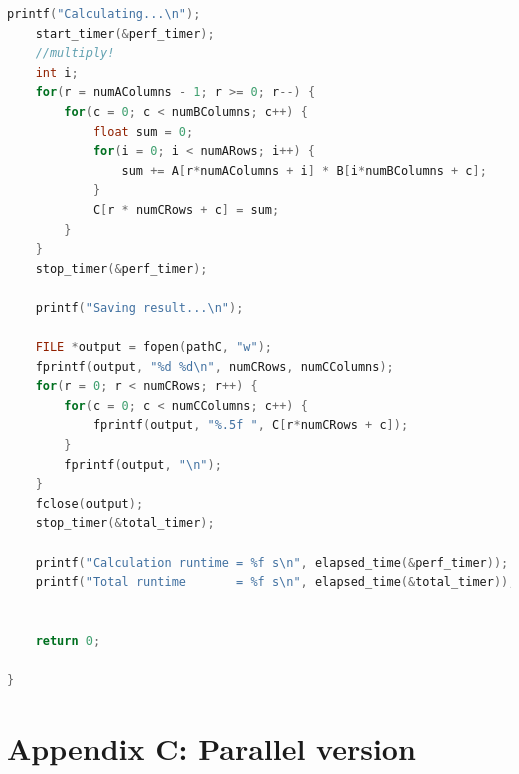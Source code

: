 \documentclass[11pt,a4paper]{article}
\begin{document}
\begin{lstlisting}[language=c]
	printf("Calculating...\n");
	start_timer(&perf_timer);
	//multiply!
	int i;
	for(r = numAColumns - 1; r >= 0; r--) {
		for(c = 0; c < numBColumns; c++) {
			float sum = 0;
			for(i = 0; i < numARows; i++) {
				sum += A[r*numAColumns + i] * B[i*numBColumns + c];
			}
			C[r * numCRows + c] = sum;
		}
	}
	stop_timer(&perf_timer);
	
	printf("Saving result...\n");
	
	FILE *output = fopen(pathC, "w");
	fprintf(output, "%d %d\n", numCRows, numCColumns);
	for(r = 0; r < numCRows; r++) {
		for(c = 0; c < numCColumns; c++) {
			fprintf(output, "%.5f ", C[r*numCRows + c]);
		}
		fprintf(output, "\n");
	}
	fclose(output);
	stop_timer(&total_timer);
	
	printf("Calculation runtime = %f s\n", elapsed_time(&perf_timer));
	printf("Total runtime       = %f s\n", elapsed_time(&total_timer));
	
	
	return 0;
	
}
	\end{lstlisting}
	
	\section{Appendix C: Parallel version}
	
\end{document}
